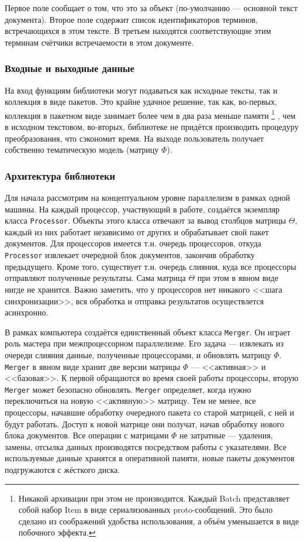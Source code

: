  Первое поле сообщает о том, что это за объект (по-умолчанию --- основной текст документа). Второе поле содержит список идентификаторов терминов, встречающихся в этом тексте. В третьем находятся соответствующие этим терминам счётчики встречаемости в этом документе.

\subsubsection{Входные и выходные данные}
На вход функциям библиотеки могут подаваться как исходные тексты, так и коллекция в виде пакетов. Это крайне удачное решение, так как, во-первых, коллекция в пакетном виде занимает более чем в два раза меньше памяти
\footnote{Никакой архивации при этом не производится. Каждый Batch представляет собой набор Item в виде сериализованных proto-сообщений. Это было сделано из соображений удобства использования, а объём уменьшается в виде побочного эффекта.}
, чем в исходном текстовом, во-вторых, библиотеке не придётся производить процедуру преобразования, что сэкономит время. 
На выходе пользователь получает собственно тематическую модель (матрицу $\Phi$).

\subsubsection{Архитектура библиотеки} 
Для начала рассмотрим на концептуальном уровне параллелизм в рамках одной машины. На каждый процессор, участвующий в работе, создаётся экземпляр класса \verb|Processor|. Объекты этого класса отвечают за вывод столбцов матрицы $\Theta$, каждый из них работает независимо от других и обрабатывает свой пакет документов. Для процессоров имеется т.н. очередь процессоров, откуда \verb|Processor| извлекает очередной блок документов, закончив обработку предыдущего. Кроме того, существует т.н. очередь слияния, куда все процессоры отправляют полученные результаты. Сама матрица $\Theta$ при этом в явном виде нигде не хранится. Важно заметить, что у процессоров нет никакого <<шага синхронизации>>, вся обработка и отправка результатов осуществлется асинхронно.

В рамках компьютера создаётся единственный объект класса \verb|Merger|. Он играет роль мастера при межпроцессорном параллелизме. Его задача --- извлекать из очереди слияния данные, полученные процессорами, и обновлять матрицу $\Phi$. \verb|Merger| в явном виде хранит две версии матрицы $\Phi$ --- <<активная>> и <<базовая>>. К первой обращаются во время своей работы процессоры, вторую \verb|Merger| может безопасно обновлять. \verb|Merger| определяет, когда нужно переключиться на новую <<активную>> матрицу. Тем не менее, все процессоры, начавшие обработку очередного пакета со старой матрицей, с ней и будут работать. Доступ к новой матрице они получат, начав обработку нового блока документов. Все операции с матрицами $\Phi$ не затратные --- удаления, замены, отсылка данных производятся посредством работы с указателями. Все используемые данные хранятся в оперативной памяти, новые пакеты документов подгружаются с жёсткого диска.

